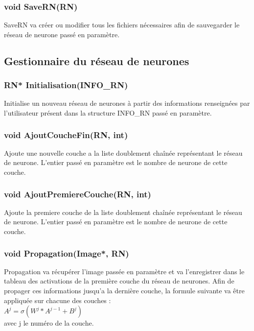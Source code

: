 \documentclass{article}
\begin{document}
		\subsubsection{\textcolor{myblue}{\textbf{void}} SaveRN(\textcolor{myblue}{\textbf{RN}})}
		SaveRN va créer ou modifier tous les fichiers nécessaires afin de sauvegarder le réseau de neurone passé en paramètre.
		
	
	\subsection{Gestionnaire du réseau de neurones}
		\subsubsection{\textcolor{myblue}{\textbf{RN*}} Initialisation(\textcolor{myblue}{\textbf{INFO\_RN}})}
		Initialise un nouveau réseau de neurones à partir des informations renseignées par l'utilisateur présent dans la structure INFO\_RN passé en paramètre.
		
		\subsubsection{\textcolor{myblue}{\textbf{void}} AjoutCoucheFin(\textcolor{myblue}{\textbf{RN}}, \textcolor{myblue}{\textbf{int}})}
		Ajoute une nouvelle couche a la liste doublement chaînée représentant le réseau de neurone. L'entier passé en paramètre est le nombre de neurone de cette couche.
		
		\subsubsection{\textcolor{myblue}{\textbf{void}} AjoutPremiereCouche(\textcolor{myblue}{\textbf{RN}}, \textcolor{myblue}{\textbf{int}})}
		Ajoute la premiere couche de la liste doublement chaînée représentant le réseau de neurone. L'entier passé en paramètre est le nombre de neurone de cette couche.
		
		\subsubsection{\textcolor{myblue}{\textbf{void}} Propagation(\textcolor{myblue}{\textbf{Image*}}, \textcolor{myblue}{\textbf{RN}})}
		Propagation va récupérer l'image passée en paramètre et va l'enregistrer dans le tableau des activations de la première couche du réseau de neurones. Afin de propager ces informations jusqu'a la dernière couche, la formule suivante va être appliquée sur chacune des couches :\\ $A^j = \sigma(W^j*A^{j-1}+B^j)$\\
		avec j le numéro de la couche.
		
\end{document}

